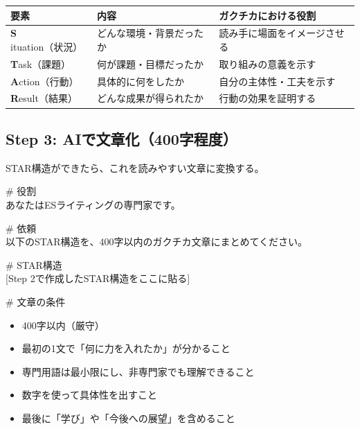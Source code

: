 \begin{table}[H]
\centering
\small
\begin{tabular}{lll}
\toprule
要素 & 内容 & ガクチカにおける役割 \\
\midrule
\textbf{S}ituation（状況） & どんな環境・背景だったか & 読み手に場面をイメージさせる \\
\textbf{T}ask（課題） & 何が課題・目標だったか & 取り組みの意義を示す \\
\textbf{A}ction（行動） & 具体的に何をしたか & 自分の主体性・工夫を示す \\
\textbf{R}esult（結果） & どんな成果が得られたか & 行動の効果を証明する \\
\bottomrule
\end{tabular}
\end{table}

\subsection{Step 3: AIで文章化（400字程度）}

STAR構造ができたら、これを読みやすい文章に変換する。

\begin{promptbox}
\# 役割\\
あなたはESライティングの専門家です。

\# 依頼\\
以下のSTAR構造を、400字以内のガクチカ文章にまとめてください。

\# STAR構造\\
{[Step 2で作成したSTAR構造をここに貼る]}

\# 文章の条件
\begin{itemize}
\item 400字以内（厳守）
\item 最初の1文で「何に力を入れたか」が分かること
\item 専門用語は最小限にし、非専門家でも理解できること
\item 数字を使って具体性を出すこと
\item 最後に「学び」や「今後への展望」を含めること
\end{itemize}
\end{promptbox}

